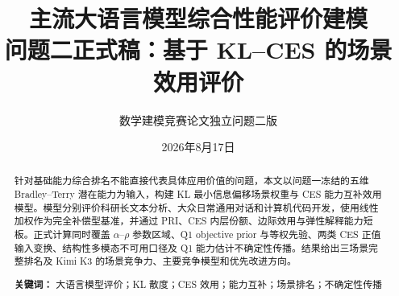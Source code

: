 \documentclass[UTF8,12pt]{ctexart}
\title{主流大语言模型综合性能评价建模\\[0.5em]\Large 问题二正式稿：基于 KL--CES 的场景效用评价}
\author{数学建模竞赛论文独立问题二版}
\date{2026年8月17日}
\begin{document}
\maketitle
\begin{abstract}
针对基础能力综合排名不能直接代表具体应用价值的问题，本文以问题一冻结的五维 Bradley--Terry 潜在能力为输入，构建 KL 最小信息偏移场景权重与 CES 能力互补效用模型。模型分别评价科研长文本分析、大众日常通用对话和计算机代码开发，使用线性加权作为完全补偿型基准，并通过 PRI、CES 内层份额、边际效用与弹性解释能力短板。正式计算同时覆盖 $\alpha$--$\rho$ 参数区域、Q1 objective prior 与等权先验、两类 CES 正值输入变换、结构性多模态不可用口径及 Q1 能力估计不确定性传播。结果给出三场景完整排名及 Kimi K3 的场景竞争力、主要竞争模型和优先改进方向。

\noindent\textbf{关键词：} 大语言模型评价；KL 散度；CES 效用；能力互补；场景排名；不确定性传播
\end{abstract}

\tableofcontents
\clearpage


\end{document}
